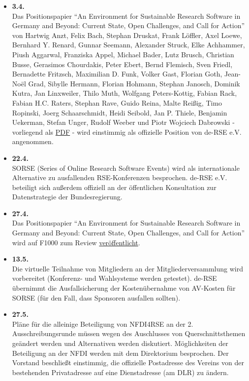\begin{itemize}
 \item \textbf{3.4.}\\Das Positionspapier "`An Environment for Sustainable Research Software in Germany and Beyond: Current State, Open Challenges, and Call for Action"' von Hartwig Anzt, Felix Bach, Stephan Druskat, Frank Löffler, Axel Loewe, Bernhard Y. Renard, Gunnar Seemann, Alexander Struck, Elke Achhammer, Piush Aggarwal, Franziska Appel, Michael Bader, Lutz Brusch, Christian Busse, Gerasimos Chourdakis, Peter Ebert, Bernd Flemisch, Sven Friedl, Bernadette Fritzsch, Maximilian D. Funk, Volker Gast, Florian Goth, Jean-Noël Grad, Sibylle Hermann, Florian Hohmann, Stephan Janosch, Dominik Kutra, Jan Linxweiler, Thilo Muth, Wolfgang Peters-Kottig, Fabian Rack, Fabian H.C. Raters, Stephan Rave, Guido Reina, Malte Reißig, Timo Ropinski, Joerg Schaarschmidt, Heidi Seibold, Jan P. Thiele, Benjamin Uekerman, Stefan Unger, Rudolf Weeber und Piotr Wojciech Dabrowski - vorliegend als \href{https://github.com/DE-RSE/positions/blob/8304df05448f22ae4293bb06ad513bc69a4ccc00/001/manuscript.pdf}{PDF} - wird einstimmig als offizielle Position von de-RSE e.V. angenommen.
 \item \textbf{22.4.}\\SORSE (Series of Online Research Software Events) wird als internationale Alternative zu ausfallenden RSE-Konferenzen besprochen.
 de-RSE e.V. beteiligt sich außerdem offiziell an der öffentlichen Konsultation zur Datenstrategie der Bundesregierung.
 \item \textbf{27.4.}\\Das Positionspapier "`An Environment for Sustainable Research Software in Germany and Beyond: Current State, Open Challenges, and Call for Action"' wird auf F1000 zum Review \href{https://f1000research.com/articles/9-295/v1}{veröffentlicht}.
 \item \textbf{13.5.}\\Die virtuelle Teilnahme von Mitgliedern an der Mitgliederversammlung wird vorbereitet (Konferenz- und Wahlsysteme werden getestet). de-RSE übernimmt die Ausfallsicherung der Kostenübernahme von AV-Kosten für SORSE (für den Fall, dass Sponsoren ausfallen sollten).
 \item \textbf{27.5.}\\Pläne für die alleinige Beteiligung von NFDI4RSE an der 2. Ausschreibungsrunde müssen wegen des Auschlusses von Querschnittsthemen geändert werden und Alternativen werden diskutiert. Möglichkeiten der Beteiligung an der NFDI werden mit dem Direktorium besprochen. Der Vorstand beschließt einstimmig, die offizielle Postadresse des Vereins von der bestehenden Privatadresse auf eine Dienstadresse (am DLR) zu ändern.

\end{itemize}
